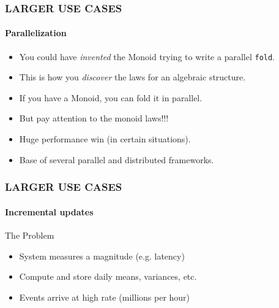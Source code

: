 \documentclass{beamer}
\begin{document}
\begin{frame}[fragile] \frametitle{LARGER USE CASES}
  \framesubtitle{Parallelization}
  \begin{itemize}
    \item You could have \emph{invented} the Monoid trying to write a parallel \texttt{fold}.
    \item This is how you \emph{discover} the laws for an algebraic structure.
    \item If you have a Monoid, you can \alert{fold it in parallel.}
    \item But pay attention to the \alert{monoid laws!!!}
    \item Huge performance win (in certain situations).
    \item Base of several parallel and distributed frameworks.
  \end{itemize}

\end{frame}


\begin{frame} \frametitle{LARGER USE CASES}
  \framesubtitle{Incremental updates}
  \begin{block}{The Problem}
    \begin{itemize}
      \item System measures a magnitude (e.g. latency)
      \item Compute and store daily means, variances, etc.
      \item Events arrive at high rate (millions per hour)
    \end{itemize}
  \end{block}


\end{frame}
\end{document}
